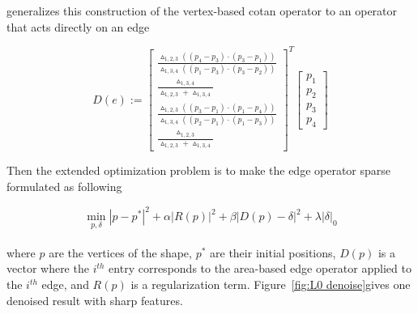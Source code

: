 \cite{he2013mesh} generalizes this construction of the vertex-based cotan operator to an operator that acts directly on an edge

\small{
\begin{equation}
 \label{eq:edgecotanoperator}
 D(e) := {\left[ \begin{array}{c}
 \frac{\vartriangle_{1,2,3}((p_4-p_3)\cdot(p_3-p_1))}{\vartriangle_{1,3,4}((p_1-p_3)\cdot(p_3-p_2))} \\
 \frac{\vartriangle_{1,3,4}}{\vartriangle_{1,2,3}+\vartriangle_{1,3,4}} \\
 \frac{\vartriangle_{1,2,3}((p_3-p_1)\cdot(p_1-p_4))}{\vartriangle_{1,3,4}((p_2-p_1)\cdot(p_1-p_3))} \\
 \frac{\vartriangle_{1,2,3}}{\vartriangle_{1,2,3}+\vartriangle_{1,3,4}}
 \end{array}
 \right]}^{T}
 \left[ \begin{array}{c}
 p_1 \\ p_2 \\ p_3 \\ p_4
 \end{array}
 \right]
\end{equation}
}

Then the extended optimization problem is to make the edge operator sparse formulated as following

\small{
\begin{equation}
 \label{eq:L0 denoise}
 \min_{p,\delta}|p-p^{*}|^2+\alpha|R(p)|^2+\beta|D(p)-\delta|^2+\lambda|\delta|_0
\end{equation}
}
\\
where $p$ are the vertices of the shape, $p^{*}$ are their initial positions, $D(p)$ is a vector where the $i^{th}$ entry corresponds to the area-based edge operator applied to the $i^{th}$ edge, and $R(p)$ is a regularization term. Figure~\ref{fig:L0 denoise}gives one denoised result with sharp features.

